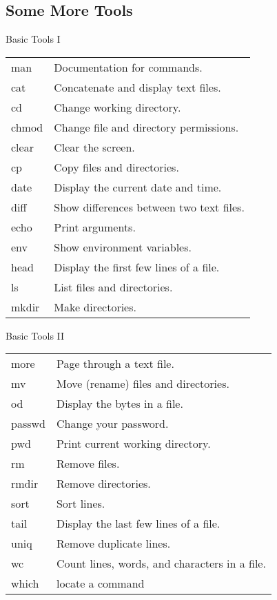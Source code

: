 \subsection{Some More Tools}

\begin{frame}{Basic Tools I}
\footnotesize{
\begin{tabular}{|l|l}
man &	Documentation for commands. \\
cat &	Concatenate and display text files.\\
cd &	Change working directory.\\
chmod &	Change file and directory permissions.\\
clear &	Clear the screen.\\
cp &	Copy files and directories.\\
date &	Display the current date and time.\\
diff &	Show differences between two text files.\\
echo &	Print arguments.\\
env &	Show environment variables.\\
head &	Display the first few lines of a file.\\
ls &	List files and directories.\\
mkdir &	Make directories.\\
\end{tabular}}
\end{frame}

\begin{frame}{Basic Tools II}
\footnotesize{
\begin{tabular}{|l|l}
more &	Page through a text file.\\
mv &	Move (rename) files and directories.\\
od &	Display the bytes in a file.\\
passwd &	Change your password.\\
pwd & Print current working directory.\\
rm & Remove files.\\
rmdir &	Remove directories.\\
sort &	Sort lines.\\
tail &	Display the last few lines of a file.\\
uniq &	Remove duplicate lines.\\
wc &	Count lines, words, and characters in a file.\\
which &	locate a command\\
\end{tabular}}
\end{frame}

